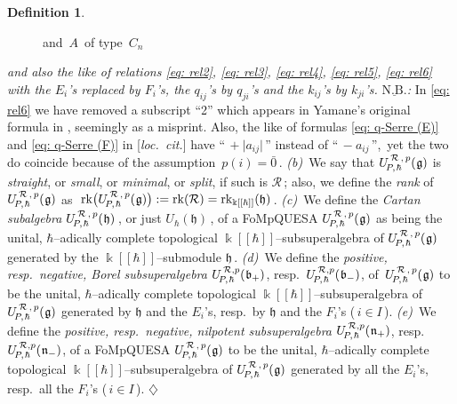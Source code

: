 \documentclass[12pt,reqno,twoside,a4paper]{amsart}
\numberwithin{equation}{section}
\theoremstyle{definition}
\newtheorem{definition}[lema]{Definition}
\newtheorem{free text}[lema]{}
\theoremstyle{remark}
\newcommand \rk{\operatorname{rk}}
\newcommand{\zero}{{\bar{0}}}
\newcommand{\R}{{\mathcal R}}
\def \kh{{\Bbbk[[\hbar]]}}
\def \lieg{\mathfrak{g}}
\def \lieb{\mathfrak{b}}
\def \lieh{\mathfrak{h}}
\def \lien{\mathfrak{n}}
\def \uRpPhg{U^{\,\R\,,\,p}_{\!P,\hskip0,7pt\hbar}(\hskip0,5pt\lieg)}
\def \uRpPhh{U^{\,\R\,,\,p}_{\!P,\hskip0,7pt\hbar}(\hskip0,5pt\lieh)}
\def \uRpPhbp{U^{\,\R,p}_{\!P,\hskip0,7pt\hbar}(\hskip0,5pt\lieb_+)}
\def \uRpPhbm{U^{\,\R,p}_{\!P,\hskip0,7pt\hbar}(\hskip0,5pt\lieb_-)}
\def \uRpPhnp{U^{\,\R,p}_{\!P,\hskip0,7pt\hbar}(\hskip0,5pt\lien_+)}
\def \uRpPhnm{U^{\,\R,p}_{\!P,\hskip0,7pt\hbar}(\hskip0,5pt\lien_-)}
\theoremstyle{plain}
\begin{document}
\begin{definition}
\begin{figure}[H]
 \quad  and  $ \, A \, $ of type  $ \, C_n $
%
\end{figure}
%
\noindent
 \textsl{and also the like of relations  \eqref{eq: rel2},  \eqref{eq: rel3}, \eqref{eq: rel4}, \eqref{eq: rel5}, \eqref{eq: rel6}  with the  $ E_i $'s  replaced by  $ F_i $'s,  the  $ q_{ij} $'s  by  $ q_{ji} $'s  and the  $ k_{ij} $'s  by  $ k_{ji} $'s.}
%
 \vskip1pt
%
   \textit{$ \underline{\text{N.B.}} $:\/}  In  \eqref{eq: rel6}  we have removed a subscript ``2'' which appears in Yamane's original formula in  \cite{Ya1},  seemingly as a misprint.  Also, the like of formulas  \eqref{eq: q-Serre (E)}  and  \eqref{eq: q-Serre (F)}  in  [\textit{loc.\ cit.}]  have  ``$ \, +\big|a_{ij}\big| \, $''  instead of  ``$ \, -a_{ij} \, $'',  \,yet the two do coincide because of the assumption  $ \, p(i) = \zero \, $.
%
 \vskip3pt
%
   {\it (b)}\,  We say that  $ \uRpPhg $  is  \textsl{straight},  or  \textsl{small},
   or \textsl{minimal},  or  \textsl{split},
   if such is  $ \R \, $;  also, we define the  \textsl{rank\/}  of  $ \uRpPhg $  as
   $ \; \rk\!\big( \uRpPhg \big) := \rk(\R) = \rk_\kh(\lieh) \, $.
%
 \vskip3pt
%
   {\it (c)}\,  We define the  {\sl Cartan subalgebra\/}
   $ \uRpPhh \, $,  or just  $ U_\hbar(\lieh) \, $,  of a FoMpQUESA  $ \uRpPhg $
   as being the unital,  $ \hbar $--adically  complete topological
   $ \kh $--subsuperalgebra  of  $ \uRpPhg $
   generated by the  $ \kh $--submodule  $ \lieh \, $.
%
 \vskip3pt
%
   {\it (d)}\,  We define the  {\sl positive, resp.\ negative, Borel subsuperalgebra\/}
   $ \uRpPhbp $,  resp.\  $ \uRpPhbm $,
 of  $ \, \uRpPhg $  to be
 the unital,  $ \hbar $--adically  complete topological  $ \kh $--subsu\-peralgebra of
 $ \uRpPhg $  generated by  $ \lieh $  and the  $ E_i $'s,  resp.\  by  $ \lieh $  and the
 $ F_i $'s  ($ \, i \in I \, $).
%
 \vskip5pt
%
   {\it (e)}\,  We define the  {\sl positive, resp.\ negative, nilpotent subsuperalgebra\/}
   $ \uRpPhnp $,  resp.\  $ \uRpPhnm $,
   of a FoMpQUESA  $ \uRpPhg $  to be the unital,  $ \hbar $--adically  complete topological
   $ \kh $--subsuperalgebra
   of  $ \uRpPhg $  generated by all the  $ E_i $'s,  resp.\ all the  $ F_i $'s
   ($ \, i \in I \, $).   \hfill  $ \diamondsuit $
%
\end{definition}
\end{document}
